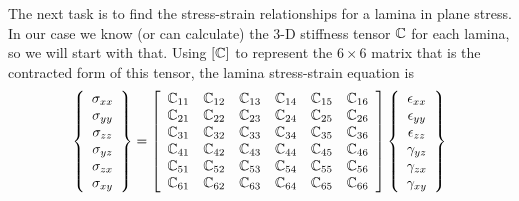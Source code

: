 \documentclass[11pt]{article}
\begin{document}
The next task is to find the stress-strain relationships for a lamina in plane stress.  In our case we know (or can calculate) the 3-D stiffness tensor $\mathbb{C}$ for each lamina, so we will start with that.  Using $[\mathbb{C}]$ to represent the $6 \times 6$ matrix that is the contracted form of this tensor, the lamina stress-strain equation is
\begin{equation}
    \left\{ \begin{array}{c}
           \sigma_{xx}  \\  \sigma_{yy}  \\  \sigma_{zz} \\  \sigma_{yz} \\ \sigma_{zx} \\  \sigma_{xy}
           \end{array} \right\}
           =
              \left[ \begin{array}{cccccc}
     \mathbb{C}_{11} &  \mathbb{C}_{12} &  \mathbb{C}_{13} &  \mathbb{C}_{14} &  \mathbb{C}_{15} &  \mathbb{C}_{16} \\
     \mathbb{C}_{21} &  \mathbb{C}_{22} &  \mathbb{C}_{23} &  \mathbb{C}_{24} &  \mathbb{C}_{25} &  \mathbb{C}_{26} \\
     \mathbb{C}_{31} &  \mathbb{C}_{32} &  \mathbb{C}_{33} &  \mathbb{C}_{34} &  \mathbb{C}_{35} &  \mathbb{C}_{36} \\
     \mathbb{C}_{41} &  \mathbb{C}_{42} &  \mathbb{C}_{43} &  \mathbb{C}_{44} &  \mathbb{C}_{45} &  \mathbb{C}_{46} \\
     \mathbb{C}_{51} &  \mathbb{C}_{52} &  \mathbb{C}_{53} &  \mathbb{C}_{54} &  \mathbb{C}_{55} &  \mathbb{C}_{56} \\
     \mathbb{C}_{61} &  \mathbb{C}_{62} &  \mathbb{C}_{63} &  \mathbb{C}_{64} &  \mathbb{C}_{65} &  \mathbb{C}_{66} 
    \end{array} \right] 
        \left\{ \begin{array}{c}
           \epsilon_{xx}  \\  \epsilon_{yy}  \\  \epsilon_{zz} \\  \gamma_{yz} \\ \gamma_{zx} \\  \gamma_{xy}
           \end{array} \right\}
     \label{stiffnessC}
 \end{equation}
\end{document}
